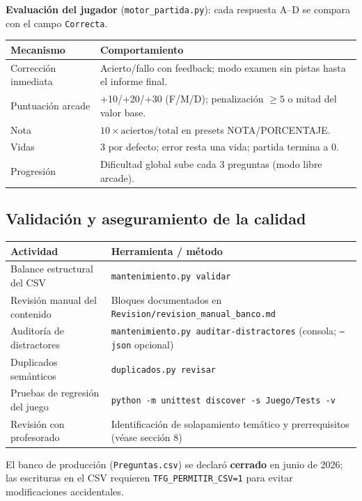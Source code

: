 \documentclass[11pt,a4paper]{article}
\newcommand{\bloquetfg}[1]{\par\smallskip\noindent #1\par}
\newcommand{\iniciotabla}{\par\medskip\renewcommand{\arraystretch}{1.12}}
\newcommand{\fintabla}{\par\medskip}
\begin{document}
\bloquetfg{\textbf{Evaluación del jugador} (\texttt{motor\_partida.py}): cada respuesta A--D se compara con el campo \texttt{Correcta}.}
\iniciotabla
\begin{tabular}{@{}lp{9.5cm}@{}}
\toprule
\textbf{Mecanismo} & \textbf{Comportamiento} \\
\midrule
Corrección inmediata & Acierto/fallo con feedback; modo examen sin pistas hasta el informe final. \\
Puntuación arcade & +10/+20/+30 (F/M/D); penalización $\geq 5$ o mitad del valor base. \\
Nota & $10 \times \text{aciertos}/\text{total}$ en presets NOTA/PORCENTAJE. \\
Vidas & 3 por defecto; error resta una vida; partida termina a 0. \\
Progresión & Dificultad global sube cada 3 preguntas (modo libre arcade). \\
\bottomrule
\end{tabular}
\fintabla

\subsection{Validación y aseguramiento de la calidad}

\iniciotabla
\begin{tabular}{@{}lp{8cm}@{}}
\toprule
\textbf{Actividad} & \textbf{Herramienta / método} \\
\midrule
Balance estructural del CSV & \texttt{mantenimiento.py validar} \\
Revisión manual del contenido & Bloques documentados en \texttt{Revision/revision\_manual\_banco.md} \\
Auditoría de distractores & \texttt{mantenimiento.py auditar-distractores} (consola; \texttt{--json} opcional) \\
Duplicados semánticos & \texttt{duplicados.py revisar} \\
Pruebas de regresión del juego & \texttt{python -m unittest discover -s Juego/Tests -v} \\
Revisión con profesorado & Identificación de solapamiento temático y prerrequisitos (véase sección 8) \\
\bottomrule
\end{tabular}
\fintabla

El banco de producción (\texttt{Preguntas.csv}) se declaró \textbf{cerrado} en junio de 2026; las escrituras en el CSV requieren \texttt{TFG\_PERMITIR\_CSV=1} para evitar modificaciones accidentales.
\end{document}
